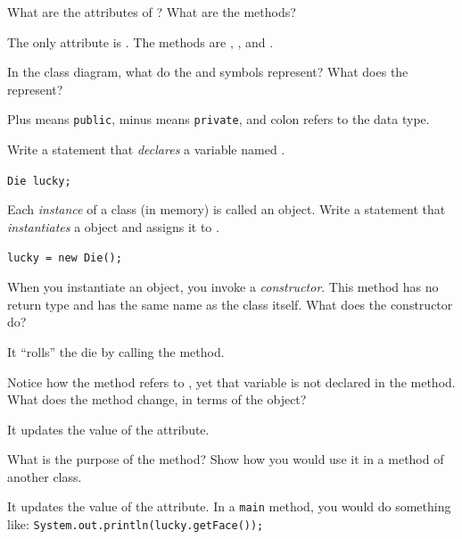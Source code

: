 

\Q What are the attributes of ? What are the methods?

\begin{answer}
The only attribute is . The methods are , , and .
\end{answer}


\Q In the class diagram, what do the \java{-} and \java{+} symbols represent? What does the \java{:} represent?

\begin{answer}
Plus means {\tt public}, minus means {\tt private}, and colon refers to the data type.
\end{answer}


\Q Write a statement that \emph{declares} a  variable named .

\begin{answer}
\tt Die lucky;
\end{answer}


\Q Each \emph{instance} of a class (in memory) is called an object. Write a statement that \emph{instantiates} a   object and assigns it to .

\begin{answer}
\tt lucky = new Die();
\end{answer}


\Q When you instantiate an object, you invoke a \emph{constructor}.
This method has no return type and has the same name as the class itself. What does the  constructor do?

\begin{answer}
It ``rolls'' the die by calling the  method.
\end{answer}


\Q Notice how the  method refers to , yet that variable is not declared in the method. What does the  method change, in terms of the  object?

\begin{answer}
It updates the value of the  attribute.
\end{answer}


\Q What is the purpose of the  method? Show how you would use it in a  method of another class.

\begin{answer}
It updates the value of the  attribute. In a {\tt main} method, you would do something like: {\tt System.out.println(lucky.getFace());}
\end{answer}
